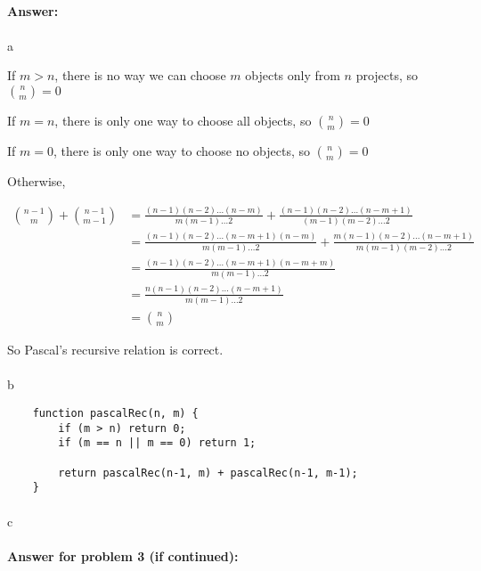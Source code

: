 \documentclass{article}
\begin{document}
\paragraph{Answer:}
\paragraph{}
a

If $m>n$, there is no way we can choose $m$ objects only from $n$ projects, so ${n \choose m}=0$

If $m=n$, there is only one way to choose all objects, so ${n \choose m}=0$

If $m=0$, there is only one way to choose no objects, so ${n \choose m}=0$

Otherwise,

$$\begin{aligned}
{n-1 \choose m} + {n-1 \choose m-1} &= \frac{(n-1)(n-2)\dots(n-m)}{m(m-1)\dots2} + \frac{(n-1)(n-2)\dots(n-m+1)}{(m-1)(m-2)\dots2}\\
&=\frac{(n-1)(n-2)\dots(n-m+1)(n-m)}{m(m-1)\dots2} + \frac{m(n-1)(n-2)\dots(n-m+1)}{m(m-1)(m-2)\dots2}\\
&=\frac{(n-1)(n-2)\dots(n-m+1)(n-m+m)}{m(m-1)\dots2}\\
&=\frac{n(n-1)(n-2)\dots(n-m+1)}{m(m-1)\dots2}\\
&={n \choose m}
\end{aligned}$$

So Pascal's recursive relation is correct.

\paragraph{}

b

\begin{verbatim}
    function pascalRec(n, m) {
        if (m > n) return 0;
        if (m == n || m == 0) return 1;

        return pascalRec(n-1, m) + pascalRec(n-1, m-1);
    }
\end{verbatim}

\paragraph{}

c


\newpage
\paragraph{Answer for problem 3 (if continued):}
\end{document}
